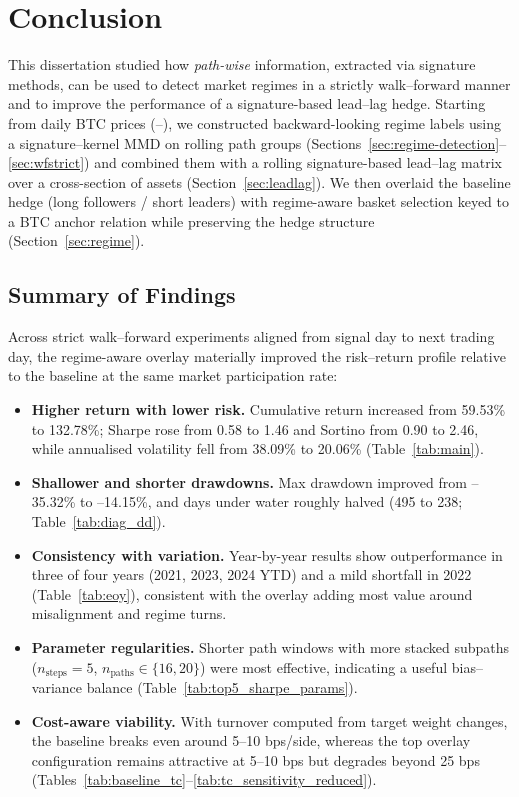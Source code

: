 \chapter{Conclusion}\label{Chapter:Conclusion}

This dissertation studied how \emph{path-wise} information, extracted via signature methods, can be used to detect market regimes in a strictly walk–forward manner and to improve the performance of a signature-based lead–lag hedge. Starting from daily BTC prices (\sampleStart{}–\sampleEnd{}), we constructed backward-looking regime labels using a signature–kernel MMD on rolling path groups (Sections~\ref{sec:regime-detection}–\ref{sec:wfstrict}) and combined them with a rolling signature-based lead–lag matrix over a cross-section of assets (Section~\ref{sec:leadlag}). We then overlaid the baseline hedge (long followers / short leaders) with regime-aware basket selection keyed to a BTC anchor relation while preserving the hedge structure (Section~\ref{sec:regime}).

\section*{Summary of Findings}
Across strict walk–forward experiments aligned from signal day to next trading day, the regime-aware overlay materially improved the risk–return profile relative to the baseline at the same market participation rate:
\begin{itemize}
  \item \textbf{Higher return with lower risk.} Cumulative return increased from 59.53\% to 132.78\%; Sharpe rose from 0.58 to 1.46 and Sortino from 0.90 to 2.46, while annualised volatility fell from 38.09\% to 20.06\% (Table~\ref{tab:main}).
  \item \textbf{Shallower and shorter drawdowns.} Max drawdown improved from --35.32\% to --14.15\%, and days under water roughly halved (495 to 238; Table~\ref{tab:diag_dd}).
  \item \textbf{Consistency with variation.} Year-by-year results show outperformance in three of four years (2021, 2023, 2024 YTD) and a mild shortfall in 2022 (Table~\ref{tab:eoy}), consistent with the overlay adding most value around misalignment and regime turns.
  \item \textbf{Parameter regularities.} Shorter path windows with more stacked subpaths (\(n_{\text{steps}}{=}5\), \(n_{\text{paths}}\in\{16,20\}\)) were most effective, indicating a useful bias–variance balance (Table~\ref{tab:top5_sharpe_params}).
  \item \textbf{Cost-aware viability.} With turnover computed from target weight changes, the baseline breaks even around 5–10 bps/side, whereas the top overlay configuration remains attractive at 5–10 bps but degrades beyond 25 bps (Tables~\ref{tab:baseline_tc}–\ref{tab:tc_sensitivity_reduced}).
\end{itemize}

